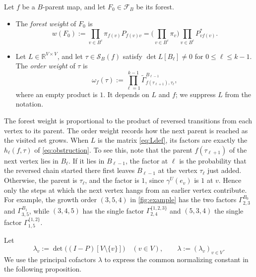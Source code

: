 \documentclass[onefignum,onetabnum]{siamart250211}
\numberwithin{theorem}{section}
\numberwithin{equation}{section}
\newcommand{\Orders}{\mathcal{S}}
\newcommand{\Fset}{\mathcal{F}}
\newcommand{\R}{\mathbb{R}}
\begin{document}
\begin{definition}\label{def:weight}
Let $f$ be a $B$-parent map, and let $F_0\in\Fset_B$ be its forest.
\begin{itemize}
\item[(a)] The \emph{forest weight} of $F_0$ is
\begin{equation}\label{eq:forestweight}
w(F_0):=\prod_{v\in B^c}\pi_{f(v)}P_{f(v)v}
=\Big(\prod_{v\in B^c}\pi_v\Big)\prod_{v\in B^c}P^{*}_{vf(v)} .
\end{equation}
\item[(b)] Let $L\in\R^{V\times V}$, and let $\tau\in\Orders_B(f)$
satisfy $\det L[B_\ell]\ne0$ for $0\le \ell\le k-1$. The \emph{order
weight} of $\tau$ is
\begin{equation}\label{eq:weight}
\omega_f(\tau):=\prod_{\ell=1}^{k-1}\tilde\Gamma^{B_{\ell-1}}_{f(\tau_{\ell+1}),\tau_\ell},
\end{equation}
where an empty product is $1$. It depends on $L$ and $f$; we suppress
$L$ from the notation.
\end{itemize}
\end{definition}

The forest weight is proportional to the product of reversed
transitions from each vertex to its parent. The order weight records
how the next parent is reached as the visited set grows. When $L$ is
the matrix \eqref{eq:Ldef}, its factors are exactly the
$h_\ell(f,\tau)$ of \eqref{eq:obstruction}. To see this, note that the parent
$f(\tau_{\ell+1})$ of the next vertex lies in $B_\ell$. If it lies in
$B_{\ell-1}$, the factor at $\ell$ is the
probability that the reversed chain started there first leaves
$B_{\ell-1}$ at the vertex $\tau_\ell$ just added. Otherwise, the parent
is $\tau_\ell$, and the factor is $1$, since $\gamma^{U}(e_v)$ is $1$ at
$v$. Hence only the steps at which the next vertex hangs from an earlier
vertex contribute. For example, the growth order $(3,5,4)$ in
\cref{fig:example} has the two factors $\Gamma^{B_0}_{2,3}$ and
$\Gamma^{B_1}_{3,5}$, while $(3,4,5)$ has the single factor
$\Gamma^{\{1,2,3\}}_{2,4}$ and $(5,3,4)$ the single factor
$\Gamma^{\{1,2\}}_{1,5}$.

Let
\begin{equation}\label{eq:lam}
\lambda_v:=\det\big((I-P)[V\setminus\{v\}]\big)\quad(v\in V),
\qquad \lambda:=(\lambda_v)_{v\in V}.
\end{equation}
We use the principal cofactors $\lambda$ to express the common
normalizing constant in the following proposition.
\end{document}

